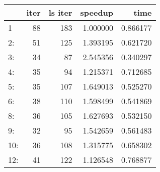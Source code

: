 \begin{tabular}{lrrrr}
\toprule
{} &  iter &  ls iter &   speedup &      time \\
\midrule
1   &    88 &      183 &  1.000000 &  0.866177 \\
2:  &    51 &      125 &  1.393195 &  0.621720 \\
3:  &    34 &       87 &  2.545356 &  0.340297 \\
4:  &    35 &       94 &  1.215371 &  0.712685 \\
5:  &    35 &      107 &  1.649013 &  0.525270 \\
6:  &    38 &      110 &  1.598499 &  0.541869 \\
8:  &    36 &      105 &  1.627693 &  0.532150 \\
9:  &    32 &       95 &  1.542659 &  0.561483 \\
10: &    36 &      108 &  1.315775 &  0.658302 \\
12: &    41 &      122 &  1.126548 &  0.768877 \\
\bottomrule
\end{tabular}
